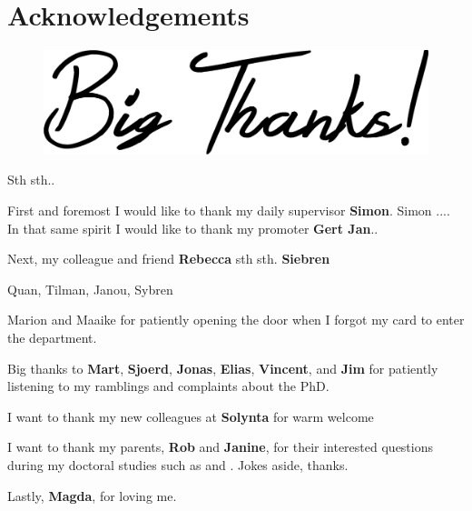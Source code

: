 \section{Acknowledgements}

\vspace*{\fill}
\begin{figure}[H]
    \center
    \includegraphics[width=0.8\linewidth]{ch.appendix/imgs/bigthanks.png}
\end{figure}
\vspace*{\fill}

\newpage

Sth sth..

First and foremost I would like to thank my daily supervisor \textbf{Simon}. Simon .... In that same spirit I would like to thank my promoter \textbf{Gert Jan}..

Next, my colleague and friend \textbf{Rebecca} sth sth. \textbf{Siebren}

Quan, Tilman, Janou, Sybren

Marion and Maaike for patiently opening the door when I forgot my card to enter the department.

Big thanks to \textbf{Mart}, \textbf{Sjoerd}, \textbf{Jonas}, \textbf{Elias}, \textbf{Vincent}, and \textbf{Jim} for patiently listening to my ramblings and complaints about the PhD.

I want to thank my new colleagues at \textbf{Solynta} for warm welcome

I want to thank my parents, \textbf{Rob} and \textbf{Janine}, for their interested questions during my doctoral studies such as  and . Jokes aside, thanks.

Lastly, \textbf{Magda}, for loving me.

\newpage
